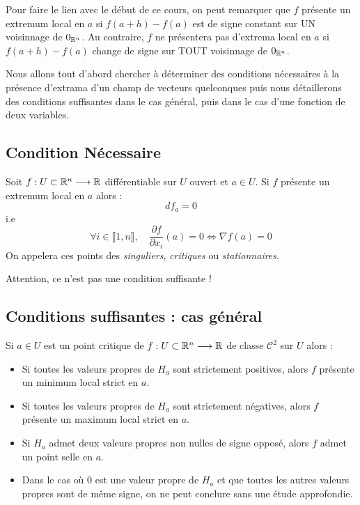 \begin{remark}
    Pour faire le lien avec le début de ce cours, on peut remarquer que 
    $f$ présente un extremum local en $a$ si $f(a +h) - f(a)$ est de signe constant sur UN voisinnage de $0_{\mathbb{R}^n}$. 
    Au contraire, $f$ ne présentera pas d'extrema local en $a$ si $f(a + h) - f(a)$ change de signe sur 
    TOUT voisinnage de $0_{\mathbb{R}^n}$. 
\end{remark}

Nous allons tout d'abord chercher à déterminer des conditions nécessaires à la présence d'extrama 
d'un champ de vecteurs quelconques puis nous détaillerons des conditions suffisantes 
dans le cas général, puis dans le cas d'une fonction de deux variables. 

\subsection{Condition Nécessaire}

\begin{theorem}
    Soit $f : U \subset \mathbb{R}^n \longrightarrow \mathbb{R}$ différentiable sur $U$ ouvert et $a \in U$. 
    Si $f$ présente un extremum local en $a$ alors : 
        \[ df_a = 0 \] 
    i.e 
        \[ \forall i \in \llbracket 1, n \rrbracket, \quad \frac{ \partial f}{ \partial x_i}(a) = 0 \iff \nabla f(a) = 0 \] 
    On appelera ces points des \emph{singuliers}, \emph{critiques} ou \emph{stationnaires}. 
\end{theorem}

Attention, ce n'est pas une condition suffisante ! 

\subsection{Conditions suffisantes : cas général}

\begin{theorem}
    Si $a \in U$ est un point critique de $f : U \subset \mathbb{R}^n \longrightarrow \mathbb{R}$ de classe $ \mathcal{C}^2$ sur 
    $U$ alors : 
    \begin{itemize}
        \item Si toutes les valeurs propres de $H_a$ sont strictement positives, alors $f$ présente un
        minimum local strict en $a$. 
        \item Si toutes les valeurs propres de $H_a$ sont strictement négatives, alors $f$ présente un
        maximum local strict en $a$. 
        \item Si $H_a$ admet deux valeurs propres non nulles de signe opposé, alors $f$ admet un point selle en $a$. 
        \item Dans le cas où $0$ est une valeur propre de $H_a$ et que toutes les autres valeurs propres sont 
        de même signe, on ne peut conclure sans une étude approfondie. 
    \end{itemize}
\end{theorem}

